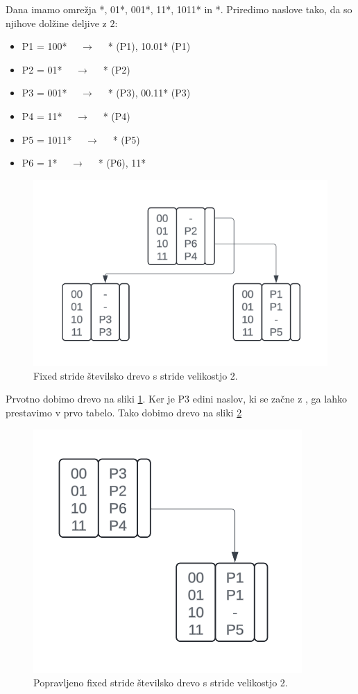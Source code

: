 \documentclass{article}
\begin{document}
Dana imamo omrežja {*, 01*, 001*, 11*, 1011*} in {*}.
Priredimo naslove tako, da so njihove dolžine deljive z $2$:
\begin{itemize}
    \item {\selectfont P1 = 100*} $\quad\rightarrow\quad$ {* (P1), 10.01* (P1)} 
    \item {\selectfont P2 = 01*} $\quad\rightarrow\quad$ {* (P2)}
    \item {\selectfont P3 = 001*} $\quad\rightarrow\quad$ {* (P3), 00.11* (P3)}
    \item {\selectfont P4 = 11*} $\quad\rightarrow\quad$ {* (P4)}
    \item {\selectfont P5 = 1011*} $\quad\rightarrow\quad$ {* (P5)}
    \item {\selectfont P6 = 1*} $\quad\rightarrow\quad$ {* (P6), 11*}
\end{itemize}

\begin{figure}[h!]
    \centering
    \includegraphics[width=0.7\linewidth]{st_drevo_1.png}
    \caption{Fixed stride številsko drevo s stride velikostjo 2.}
    \label{slika1}
\end{figure}
Prvotno dobimo drevo na sliki \ref*{slika1}. Ker je {\selectfont P3} edini naslov, ki se začne z {}, ga lahko prestavimo v prvo tabelo. Tako dobimo drevo na sliki \ref*{slika2}


\begin{figure}[h!]
    \centering
    \includegraphics[width=0.5\linewidth]{st_drevo.png}
    \caption{Popravljeno fixed stride številsko drevo s stride velikostjo 2.}
    \label{slika2}
\end{figure}
\end{document}
